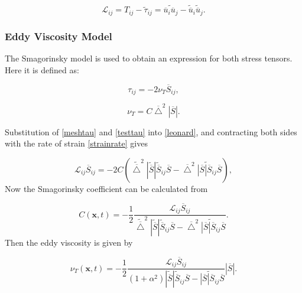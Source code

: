\begin{equation}\label{leonard}
\mathcal L_{ij} = T_{ij} - \widetilde{\tau}_{ij} = \widetilde{\overline u_i \overline u_j} - \widetilde{\overline u}_i \widetilde{\overline u}_j.
\end{equation}

\subsubsection{Eddy Viscosity Model}

The Smagorinsky model is used to obtain an expression for both stress tensors. Here it is defined as:

\begin{equation}\label{smagtau}
\tau_{ij} = -2 \nu_T \overline S_{ij},
\end{equation}

\begin{equation}\label{smagnut}
\nu_T = C \overline \bigtriangleup^2 \left | \overline S \right |.
\end{equation}

Substitution of \eqref{meshtau} and \eqref{testtau} into \eqref{leonard}, and contracting both sides with the rate of strain \eqref{strainrate} gives

\begin{equation}
\mathcal L_{ij} \overline S_{ij} = -2C(\widetilde{\overline \bigtriangleup}^2 | \widetilde{\overline S} | \widetilde{\overline S}_{ij} \overline S -
\overline \bigtriangleup^2 \widetilde{ | \overline S | \overline S_{ij}} \overline S),
\end{equation}
Now the Smagorinsky coefficient can be calculated from

\begin{equation}\label{germanocoeff}
C(\mathbf x, t) = - \frac{1}{2} \frac{\mathcal L_{ij} \overline S_{ij}}
{\widetilde{\overline \bigtriangleup}^2 | \widetilde{\overline S} | \widetilde{\overline S}_{ij} \overline S -
\overline \bigtriangleup^2 \widetilde{ | \overline S | \overline S_{ij}} \overline S}.
\end{equation}
Then the eddy viscosity is given by

\begin{equation}\label{germanovisc}
\nu_T(\mathbf x, t) = - \frac{1}{2} \frac{\mathcal L_{ij} \overline S_{ij}}
{(1+\alpha^2) | \widetilde{\overline S} | \widetilde{\overline S}_{ij} \overline S -
\widetilde{ | \overline S | \overline S_{ij}} \overline S}
\left | \overline S \right |.
\end{equation}

